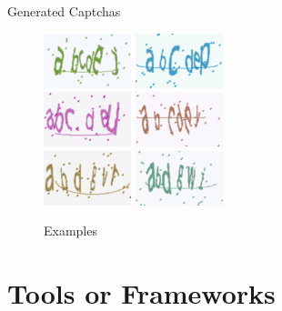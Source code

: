 \documentclass[10pt]{beamer}
\begin{document}
 \begin{frame}{Generated Captchas}
 \begin{figure}
    \centering
         \includegraphics[width=1in]{1.png}
         \hspace{1cm}
          \includegraphics[width=1in]{2.png}\\
          \vspace{0.75cm}
    \includegraphics[width=1in]{3.png}
    \hspace{1cm}
    \includegraphics[width=1in]{4.png}\\
    \vspace{0.75cm}
    \includegraphics[width=1in]{5.png}
    \hspace{1cm}
    \includegraphics[width=1in]{6.png}
    \caption{Examples}
\end{figure}

 \end{frame}
 

\section{Tools or Frameworks}
\end{document}
